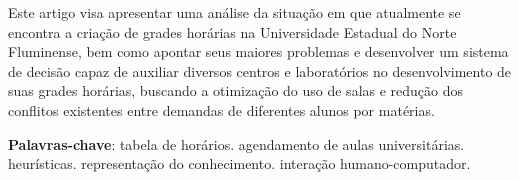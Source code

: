 \setlength{\absparsep}{18pt} %
\begin{resumo}

  Este artigo visa apresentar uma análise da situação em que atualmente se encontra a criação de grades horárias na Universidade Estadual do Norte Fluminense, bem como apontar seus maiores problemas e desenvolver um sistema de decisão capaz de auxiliar diversos centros e laboratórios no desenvolvimento de suas grades horárias, buscando a otimização do uso de salas e redução dos conflitos existentes entre demandas de diferentes alunos por matérias.

  \textbf{Palavras-chave}: tabela de horários. agendamento de aulas universitárias. heurísticas. representação do conhecimento. interação humano-computador.




\end{resumo}
